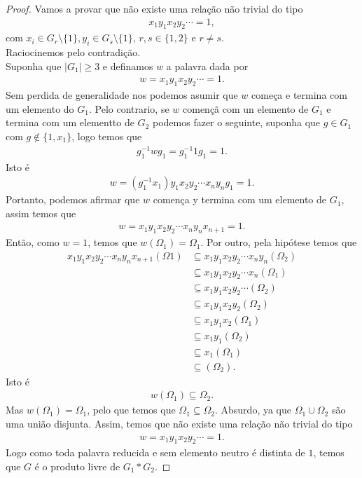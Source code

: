 \begin{proof} 
  Vamos a provar que não existe uma relação não trivial do tipo
  \begin{align*}
    x_1y_1x_2y_2\cdots=1,
  \end{align*}
  com $x_i\in G_r\setminus\{1\},y_i\in G_s\setminus\{1\},\,r,s\in\{1,2\}$ e $r\neq s$.\\
  Raciocinemos pelo contradição.\\
  Suponha que $|G_1|\geq 3$ e definamos $w$ a palavra dada por
  \begin{align*}
    w=x_1y_1x_2y_2\cdots=1.
  \end{align*}
  Sem perdida de generalidade nos podemos asumir que $w$ começa e termina com um elemento do $G_1$. Pelo contrario, se $w$ començã com un elemento de $G_1$ e termina com um elementto de $G_2$ podemos fazer o seguinte, suponha que $g\in G_1$ com $g\notin \{1,x_1\}$, logo temos que
  \begin{align*}
    g_1^{-1}wg_1=g_1^{-1}1g_1=1.
  \end{align*}
  Isto é
  \begin{align*}
    w=(g_1^{-1}x_1)y_1x_2y_2\cdots x_ny_ng_1=1.
  \end{align*}
  Portanto, podemos afirmar que $w$ comença y termina com um elemento de $G_1$, assim temos que
  \begin{align*}
    w=x_1y_1x_2y_2\cdots x_ny_nx_{n+1}=1.
  \end{align*}
  Então, como $w=1$, temos que $w(\Omega_1)=\Omega_1$. Por outro, pela hipótese temos que
  \begin{align*}
    x_1y_1x_2y_2\cdots x_ny_nx_{n+1}(\Omega 1)&\subseteq x_1y_1x_2y_2\cdots x_ny_n(\Omega_2)\\
    &\subseteq x_1y_1x_2y_2\cdots x_n(\Omega_1)\\
    &\subseteq x_1y_1x_2y_2\cdots (\Omega_2)\\
    &\subseteq x_1y_1x_2y_2(\Omega_2)\\
    &\subseteq x_1y_1x_2(\Omega_1)\\
    &\subseteq x_1y_1(\Omega_2)\\
    &\subseteq x_1(\Omega_1)\\
    &\subseteq (\Omega_2).
  \end{align*}
  Isto é
  \begin{align*}
    w(\Omega_1)\subseteq \Omega_2.
  \end{align*}
  Mas $w(\Omega_1)=\Omega_1$, pelo que temos que $\Omega_1\subseteq \Omega_2$. Absurdo, ya que $\Omega_1\cup\Omega_2$ são uma união disjunta. Assim, temos que não existe uma relação não trivial do tipo
  \begin{align*}
    w=x_1y_1x_2y_2\cdots=1.
  \end{align*}
  Logo como toda palavra reducida e sem elemento neutro é distinta de $1$, temos que $G$ é o produto livre de $G_1\ast G_2$.
\end{proof}
